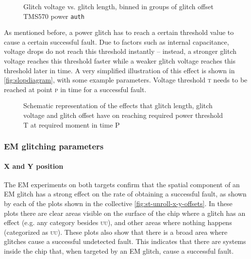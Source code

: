 \documentclass[10pt]{article}
\newcommand{\TI}{TMS570\xspace}
\newcommand{\auth}{\texttt{auth}\xspace}
\newcommand{\UU}{\textsc{uu}\xspace}
\begin{document}
\begin{figure}[H]
{            }
            \caption{Glitch voltage vs. glitch length, binned in groups of glitch offset \TI power \auth}
            \label{fig:ti-auth-voltage-length-offsets}
          \end{figure}

          \noindent As mentioned before, a power glitch has to reach a certain threshold value to cause a certain successful fault. Due to factors such as internal capacitance, voltage drops do not reach this threshold instantly -- instead, a stronger glitch voltage reaches this threshold faster while a weaker glitch voltage reaches this threshold later in time. A very simplified illustration of this effect is shown in \autoref{fig:slopdiagram}, with some example parameters. Voltage threshold \textsc{t} needs to be reached at point \textsc{p} in time for a successful fault.

          \begin{figure}[H]
            \centering
            \def\svgwidth{\columnwidth}
            
            \caption{Schematic representation of the effects that glitch length, glitch voltage and glitch offset have on reaching required power threshold \textsc{T} at required moment in time \textsc{P}}
            \label{fig:slopdiagram}
          \end{figure}


    \subsubsection{EM glitching parameters }

      \paragraph*{X and Y position}
        The EM experiments on both targets confirm that the spatial component of an EM glitch has a strong effect on the rate of obtaining a successful fault, as shown by each of the plots shown in the collective \autoref{fig:st-unroll-x-y-offsets}. In these plots there are clear areas visible on the surface of the chip where a glitch has an effect (e.g. any category besides \UU), and other areas where nothing happens (categorized as \UU). These plots also show that there is a broad area where glitches cause a successful undetected fault. This indicates that there are systems inside the chip that, when targeted by an EM glitch, cause a successful fault.
\end{document}

